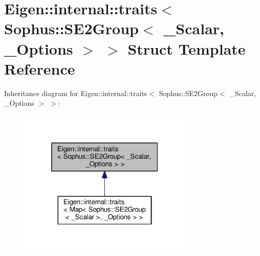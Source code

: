 \hypertarget{struct_eigen_1_1internal_1_1traits_3_01_sophus_1_1_s_e2_group_3_01___scalar_00_01___options_01_4_01_4}{}\section{Eigen\+:\+:internal\+:\+:traits$<$ Sophus\+:\+:S\+E2\+Group$<$ \+\_\+\+Scalar, \+\_\+\+Options $>$ $>$ Struct Template Reference}
\label{struct_eigen_1_1internal_1_1traits_3_01_sophus_1_1_s_e2_group_3_01___scalar_00_01___options_01_4_01_4}


Inheritance diagram for Eigen\+:\+:internal\+:\+:traits$<$ Sophus\+:\+:S\+E2\+Group$<$ \+\_\+\+Scalar, \+\_\+\+Options $>$ $>$\+:
\nopagebreak
\begin{figure}[H]
\begin{center}
\leavevmode
\includegraphics[width=235pt]{struct_eigen_1_1internal_1_1traits_3_01_sophus_1_1_s_e2_group_3_01___scalar_00_01___options_01_4_01_4__inherit__graph}
\end{center}
\end{figure}
